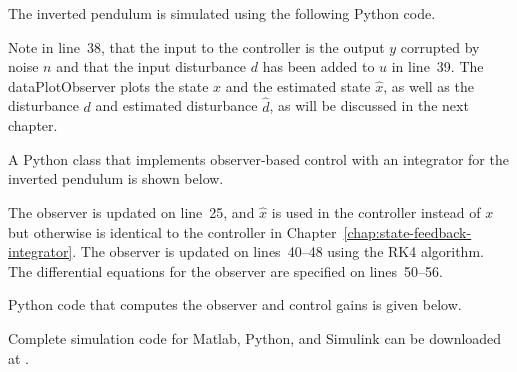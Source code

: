 The inverted pendulum is simulated using the following Python code.

Note in line~38, that the input to the controller is the output $y$ corrupted by noise $n$ and that the input disturbance $d$ has been added to $u$ in line~39.  The dataPlotObserver plots the state $x$ and the estimated state $\hat{x}$, as well as the disturbance $d$ and estimated disturbance $\hat{d}$, as will be discussed in the next chapter.  

A Python class that implements observer-based control with an integrator for the inverted pendulum is shown below.

The observer is updated on line~25, and $\hat{x}$ is used in the controller instead of $x$ but otherwise is identical to the controller in Chapter~\ref{chap:state-feedback-integrator}.  The observer is updated on lines~40--48 using the RK4 algorithm.  The differential equations for the observer are specified on lines~50--56.  

Python code that computes the observer and control gains is given below.


Complete simulation code for Matlab, Python, and Simulink can be downloaded at .


